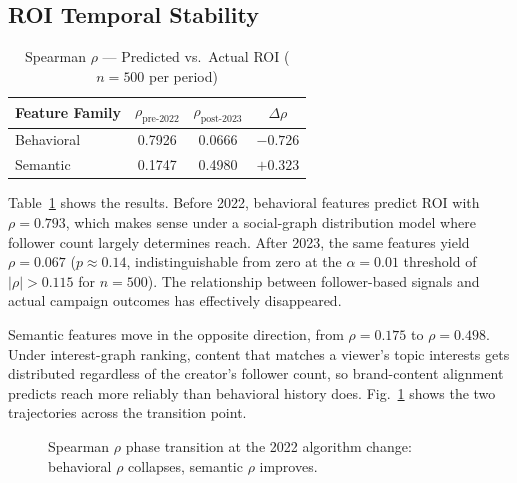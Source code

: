\documentclass[conference]{IEEEtran}
\begin{document}
\subsection{ROI Temporal Stability}

\begin{table}[t]
\caption{Spearman $\rho$ --- Predicted vs.\ Actual ROI ($n=500$ per period)}
\label{tab:temporal}
\centering
\begin{tabular}{lccc}
\toprule
\textbf{Feature Family} & $\rho_{\text{pre-2022}}$ & $\rho_{\text{post-2023}}$ & $\Delta\rho$ \\
\midrule
Behavioral & 0.7926 & 0.0666 & $-0.726$ \\
Semantic   & 0.1747 & 0.4980 & $+0.323$ \\
\bottomrule
\end{tabular}
\end{table}

Table~\ref{tab:temporal} shows the results. Before 2022, behavioral
features predict ROI with $\rho=0.793$, which makes sense under a
social-graph distribution model where follower count largely determines
reach. After 2023, the same features yield $\rho=0.067$ ($p\approx0.14$,
indistinguishable from zero at the $\alpha=0.01$ threshold of
$|\rho|>0.115$ for $n=500$). The relationship between follower-based
signals and actual campaign outcomes has effectively disappeared.

Semantic features move in the opposite direction, from $\rho=0.175$ to
$\rho=0.498$. Under interest-graph ranking, content that matches a viewer's
topic interests gets distributed regardless of the creator's follower count,
so brand-content alignment predicts reach more reliably than behavioral
history does. Fig.~\ref{fig:temporal} shows the two trajectories across
the transition point.

\begin{figure}[t]
\centering
{}%
\caption{Spearman $\rho$ phase transition at the 2022 algorithm
change: behavioral $\rho$ collapses, semantic $\rho$ improves.}
\label{fig:temporal}
\end{figure}
\end{document}
